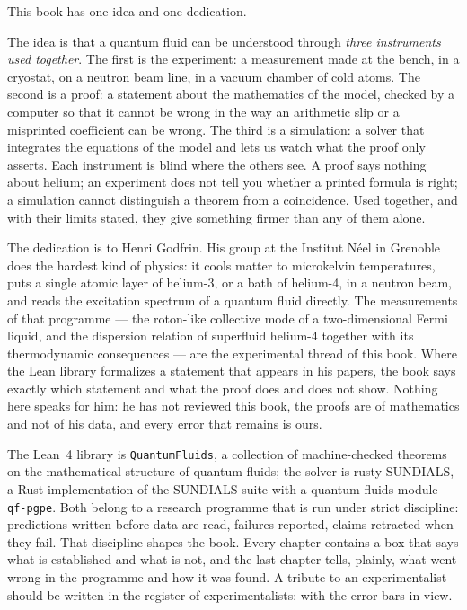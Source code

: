 This book has one idea and one dedication.

The idea is that a quantum fluid can be understood through \emph{three instruments used together}. The first is the experiment: a measurement made at the bench, in a cryostat, on a neutron beam line, in a vacuum chamber of cold atoms. The second is a proof: a statement about the mathematics of the model, checked by a computer so that it cannot be wrong in the way an arithmetic slip or a misprinted coefficient can be wrong. The third is a simulation: a solver that integrates the equations of the model and lets us watch what the proof only asserts. Each instrument is blind where the others see. A proof says nothing about helium; an experiment does not tell you whether a printed formula is right; a simulation cannot distinguish a theorem from a coincidence. Used together, and with their limits stated, they give something firmer than any of them alone.

The dedication is to Henri Godfrin. His group at the Institut N\'eel in Grenoble does the hardest kind of physics: it cools matter to microkelvin temperatures, puts a single atomic layer of helium-3, or a bath of helium-4, in a neutron beam, and reads the excitation spectrum of a quantum fluid directly. The measurements of that programme --- the roton-like collective mode of a two-dimensional Fermi liquid, and the dispersion relation of superfluid helium-4 together with its thermodynamic consequences --- are the experimental thread of this book. Where the Lean library formalizes a statement that appears in his papers, the book says exactly which statement and what the proof does and does not show. Nothing here speaks for him: he has not reviewed this book, the proofs are of mathematics and not of his data, and every error that remains is ours.

The Lean~4 library is \texttt{QuantumFluids}, a collection of machine-checked theorems on the mathematical structure of quantum fluids; the solver is rusty-SUNDIALS, a Rust implementation of the SUNDIALS suite with a quantum-fluids module \texttt{qf-pgpe}. Both belong to a research programme that is run under strict discipline: predictions written before data are read, failures reported, claims retracted when they fail. That discipline shapes the book. Every chapter contains a box that says what is established and what is not, and the last chapter tells, plainly, what went wrong in the programme and how it was found. A tribute to an experimentalist should be written in the register of experimentalists: with the error bars in view.

